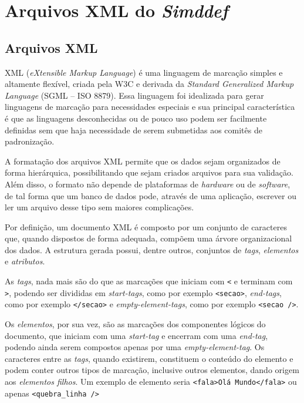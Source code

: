 \chapter{Arquivos XML do \textbf{\textit{Simddef}}}
\label{ap:formatacao_xml}

\section{Arquivos XML}
XML ({\it eXtensible Markup Language}) é uma linguagem de marcação simples e
altamente flexível, criada pela W3C e derivada da {\it Standard Generalized
Markup Language} (SGML -- ISO 8879). Essa linguagem foi idealizada para gerar
linguagens de marcação para necessidades especiais e sua principal
característica é que as linguagens desconhecidas ou de pouco uso podem ser
facilmente definidas sem que haja necessidade de serem submetidas aos comitês de
padronização.

A formatação dos arquivos XML permite que os dados sejam organizados de forma
hierárquica, possibilitando que sejam criados arquivos para sua validação. Além
disso, o formato não depende de plataformas de {\it hardware} ou de {\it
software}, de tal forma que um banco de dados pode, através de uma aplicação,
escrever ou ler um arquivo desse tipo sem maiores complicações.

Por definição, um documento XML é composto por um conjunto de caracteres que,
quando dispostos de forma adequada, compõem uma árvore organizacional dos dados.
A estrutura gerada possui, dentre outros, conjuntos de {\it tags}, {\it
elementos} e {\it atributos}.

As {\it tags}, nada mais são do que as marcações que iniciam com \verb|<| e
terminam com \verb|>|, podendo ser divididas em {\it start-tags}, como por
exemplo \verb|<secao>|, {\it end-tags}, como por exemplo \verb|</secao>| e {\it
empty-element-tags}, como por exemplo \verb|<secao />|.

Os {\it elementos}, por sua vez, são as marcações dos componentes lógicos do
documento, que iniciam com uma {\it start-tag} e encerram com uma {\it end-tag},
podendo ainda serem compostos apenas por uma {\it empty-element-tag}. Os
caracteres entre as {\it tags}, quando existirem, constituem o conteúdo do
elemento e podem conter outros tipos de marcação, inclusive outros elementos,
dando origem aos {\it elementos filhos}. Um exemplo de elemento seria
\verb|<fala>Olá Mundo</fala>| ou apenas \verb|<quebra_linha />|

